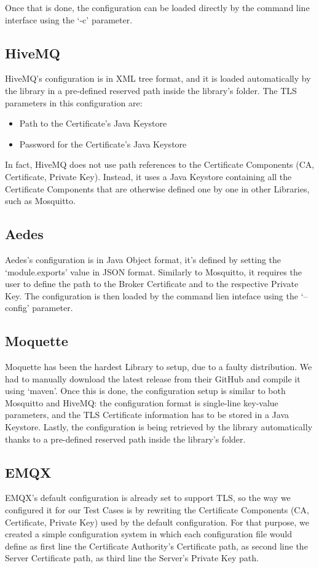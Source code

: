 \documentclass[binding=0.6cm,noexaminfo]{sapthesis}
\begin{document}
Once that is done, the configuration can be loaded directly by the command line interface using the `-c' parameter.

\subsection{HiveMQ}
HiveMQ's configuration is in XML tree format, and it is loaded automatically by the library in a pre-defined reserved path inside the library's folder. The TLS parameters in this configuration are:

\begin{itemize}
	\item Path to the Certificate's Java Keystore
	\item Password for the Certificate's Java Keystore
\end{itemize}

In fact, HiveMQ does not use path references to the Certificate Components (CA, Certificate, Private Key). Instead, it uses a Java Keystore containing all the Certificate Components that are otherwise defined one by one in other Libraries, such as Mosquitto.

\subsection{Aedes}
Aedes's configuration is in Java Object format, it's defined by setting the `module.exports' value in JSON format. Similarly to Mosquitto, it requires the user to define the path to the Broker Certificate and to the respective Private Key. The configuration is then loaded by the command lien inteface using the `--config' parameter.

\subsection{Moquette}
Moquette has been the hardest Library to setup, due to a faulty distribution. We had to manually download the latest release from their GitHub and compile it using `maven'. Once this is done, the configuration setup is similar to both Mosquitto and HiveMQ: the configuration format is single-line key-value parameters, and the TLS Certificate information has to be stored in a Java Keystore. Lastly, the configuration is being retrieved by the library automatically thanks to a pre-defined reserved path inside the library's folder.

\subsection{EMQX}
EMQX's default configuration is already set to support TLS, so the way we configured it for our Test Cases is by rewriting the Certificate Components (CA, Certificate, Private Key) used by the default configuration. For that purpose, we created a simple configuration system in which each configuration file would define as first line the Certificate Authority's Certificate path, as second line the Server Certificate path, as third line the Server's Private Key path.
\end{document}
